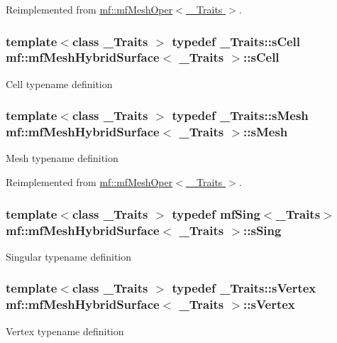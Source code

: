 Reimplemented from \hyperlink{classmf_1_1mfMeshOper_a526d1466339244781fbdc0dbfe5ad210}{mf::mfMeshOper$<$ \_\-Traits $>$}.

\hypertarget{classmf_1_1mfMeshHybridSurface_ae8effc64c1dfb9b88223478812400505}{
\subsubsection[{sCell}]{\setlength{\rightskip}{0pt plus 5cm}template$<$class \_\-Traits $>$ typedef \_\-Traits::sCell {\bf mf::mfMeshHybridSurface}$<$ \_\-Traits $>$::{\bf sCell}}}
\label{classmf_1_1mfMeshHybridSurface_ae8effc64c1dfb9b88223478812400505}
Cell typename definition \hypertarget{classmf_1_1mfMeshHybridSurface_a204a2dcbd0802b263253055d7d2d1b9a}{
\subsubsection[{sMesh}]{\setlength{\rightskip}{0pt plus 5cm}template$<$class \_\-Traits $>$ typedef \_\-Traits::sMesh {\bf mf::mfMeshHybridSurface}$<$ \_\-Traits $>$::{\bf sMesh}}}
\label{classmf_1_1mfMeshHybridSurface_a204a2dcbd0802b263253055d7d2d1b9a}
Mesh typename definition 

Reimplemented from \hyperlink{classmf_1_1mfMeshOper_a96c05da9a054cf9ac58d15211922f936}{mf::mfMeshOper$<$ \_\-Traits $>$}.

\hypertarget{classmf_1_1mfMeshHybridSurface_ac9e0a04d9e5f9cf40d751f7661ac9a7a}{
\subsubsection[{sSing}]{\setlength{\rightskip}{0pt plus 5cm}template$<$class \_\-Traits $>$ typedef {\bf mfSing}$<$\_\-Traits$>$ {\bf mf::mfMeshHybridSurface}$<$ \_\-Traits $>$::{\bf sSing}}}
\label{classmf_1_1mfMeshHybridSurface_ac9e0a04d9e5f9cf40d751f7661ac9a7a}
Singular typename definition \hypertarget{classmf_1_1mfMeshHybridSurface_a3739f5c613f7c0fce7946c0f4fdeeb1b}{
\subsubsection[{sVertex}]{\setlength{\rightskip}{0pt plus 5cm}template$<$class \_\-Traits $>$ typedef \_\-Traits::sVertex {\bf mf::mfMeshHybridSurface}$<$ \_\-Traits $>$::{\bf sVertex}}}
\label{classmf_1_1mfMeshHybridSurface_a3739f5c613f7c0fce7946c0f4fdeeb1b}
Vertex typename definition 

